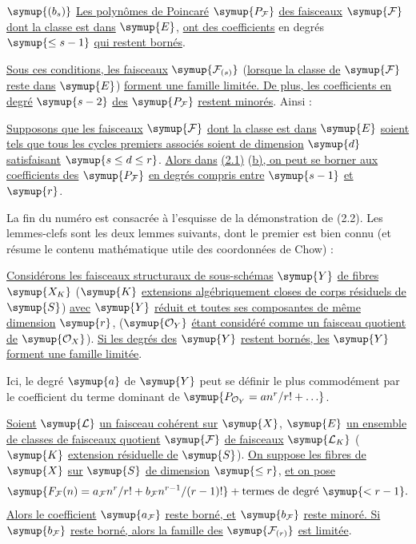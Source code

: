 \medskip
\noindent $\symup{(b_s)}$ \uline{Les polynômes de Poincaré} $\symup{P_{\mathcal F}}$ \uline{des faisceaux}
$\symup{\mathcal F}$ \uline{dont la classe est dans} $\symup{E}$, \uline{ont des coefficients} en degrés
$\symup{\leq s-1}$ \uline{qui restent bornés}.

\uline{Sous ces conditions, les faisceaux} $\symup{\mathcal F_{(s)}}$ (\uline{lorsque la classe de}
$\symup{\mathcal F}$ \uline{reste dans} $\symup{E}$) \uline{forment une famille limitée. De plus, les
coefficients en degré} $\symup{s-2}$ \uline{des} $\symup{P_{\mathcal F}}$ \uline{restent minorés}.
Ainsi :

 \uline{Supposons que les faisceaux} $\symup{\mathcal F}$ \uline{dont la classe
est dans} $\symup{E}$ \uline{soient tels que tous les cycles premiers associés soient de
dimension} $\symup{d}$ \uline{satisfaisant} $\symup{s\leq d\leq r}$. \uline{Alors dans} \uline{(2.1)} (\uline{b), on peut se
borner aux coefficients des} $\symup{P_{\mathcal F}}$ \uline{en degrés compris entre} $\symup{s-1}$ \uline{et}
$\symup{r}$.

La fin du numéro est consacrée à l'esquisse de la démonstration de (2.2). Les
lemmes-clefs sont les deux lemmes suivants, dont le premier est bien connu (et
résume le contenu mathématique utile des coordonnées de Chow) :

 \uline{Considérons les faisceaux structuraux de
sous-schémas} $\symup{Y}$ \uline{de fibres} $\symup{X_K}$ ($\symup{K}$ \uline{extensions algébriquement closes de corps
résiduels de} $\symup{S}$) \uline{avec} $\symup{Y}$ \uline{réduit et toutes ses composantes de même dimension}
$\symup{r}$, ($\symup{\mathcal O_Y}$ \uline{étant considéré comme un faisceau quotient de}
$\symup{\mathcal O_X}$). \uline{Si les degrés des} $\symup{Y}$ \uline{restent bornés, les} $\symup{Y}$ \uline{forment une
famille limitée}.

Ici, le degré $\symup{a}$ de $\symup{Y}$ peut se définir le plus commodément par le coefficient
du terme dominant de $\symup{P_{\mathcal O_Y}=an^r/r!+\ldots}$.

 \uline{Soient} $\symup{\mathcal L}$ \uline{un faisceau cohérent sur} $\symup{X}$, $\symup{E}$ \uline{un
ensemble de classes de faisceaux quotient} $\symup{\mathcal F}$ \uline{de faisceaux}
$\symup{\mathcal L_K}$ ($\symup{K}$ \uline{extension résiduelle de} $\symup{S}$). \uline{On suppose les fibres de} $\symup{X}$
\uline{sur} $\symup{S}$ \uline{de dimension} $\symup{\leq r}$, \uline{et on pose}
\[
\symup{F_{\mathcal F}(n)=a_{\mathcal F}n^r/r!+b_{\mathcal F}n^{r-1}/(r-1)!}+\text{termes de degré $\symup{<r-1}$}.
\]
\uline{Alors le coefficient} $\symup{a_{\mathcal F}}$ \uline{reste borné, et} $\symup{b_{\mathcal F}}$ \uline{reste
minoré. Si} $\symup{b_{\mathcal F}}$ \uline{reste borné, alors la famille des}
$\symup{\mathcal F_{(r)}}$ \uline{est limitée}.

